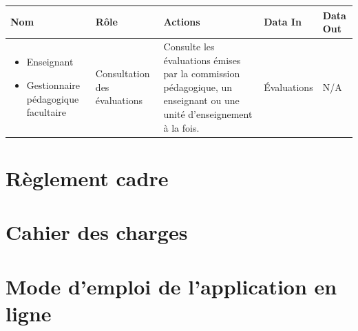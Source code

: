 \documentclass[a4paper,11pt]{report}
\begin{document}
\begin{tabularx}{\linewidth}{|X|X|X|X|X|} \hline
Nom & Rôle & Actions & Data In & Data Out \\ \hline 
\begin{itemize}
	\item Enseignant
	\item Gestionnaire pédagogique facultaire
\end{itemize}
& Consultation des évaluations & Consulte les évaluations émises par la commission pédagogique, un enseignant ou une unité d'enseignement à la fois. & Évaluations & N/A \\ \hline
\end{tabularx}




\appendix
\renewcommand{\partname}{Annexe}
\setcounter{part}{0}%
\part{Règlement cadre}\label{an:regl-cadre}


\part{Cahier des charges}\label{an:cachier-charges}


\part{Mode d'emploi de l'application en ligne}\label{an:mode-emploi}

\end{document}
